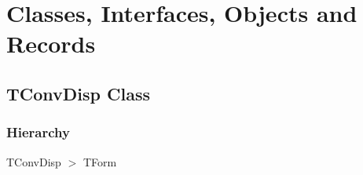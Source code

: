\documentclass{report}
\newif\ifpdf
\begin{document}
\section{Classes, Interfaces, Objects and Records}
\ifpdf
\subsection*{\large{\textbf{TConvDisp Class}}\normalsize\hspace{1ex}\hrulefill}
\else
\subsection*{TConvDisp Class}
\fi
\label{pkgconvertdisp.TConvDisp}
\subsubsection*{\large{\textbf{Hierarchy}}\normalsize\hspace{1ex}\hfill}
TConvDisp {$>$} TForm
\end{document}
